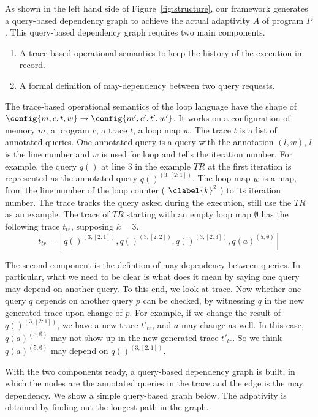As shown in the left hand side of Figure~\ref{fig:structure}, our framework generates a query-based dependency graph to achieve the actual adaptivity $A$ of program $P$. This query-based dependency graph requires two main components. 
\begin{enumerate}
    \item A trace-based operational semantics to keep the history of the execution in record.
    \item A formal definition of may-dependency between two query requests.
\end{enumerate}
  The trace-based operational semantics of the loop language have the shape of $\config{m, c, t,w} \xrightarrow{} \config{m', c',  t', w'}  $. It works on a configuration of memory $m$, a program $c$, a trace $t$, a loop map $w$. The trace $t$ is a list of annotated queries. One annotated query is a  
  query with the annotation $(l,w)$, $l$ is the line number and $w$ is used for loop and tells the iteration number. For example, the 
  query $q()$ at line $3$ in the example $TR$ at the first iteration is represented as the annotated query $q()^{(3, [2:1])}$. The loop map $w$ is a map, from the line number of the loop counter ( $\clabel{k}^{2}$ ) to its iteration number. The trace tracks the query asked during the execution, still use the $TR$ as an example. The trace of $TR$ starting with an empty loop map $\emptyset$ has the following trace $t_{tr}$, supposing $k=3$. 
  \[t_{tr} = [q()^{(3,[2:1])},q()^{(3,[2:2])},q()^{(3,[2:3])}, q(a)^{(5,\emptyset)}  ] \]
  
The second component is the defintion of may-dependency between queries. In particular, what we need to be clear is what does it mean by saying one query may depend on another query. To this end, we look at trace.  Now whether one query $q$ depends on another query $p$ can be checked, by witnessing $q$ in the new generated trace upon change of $p$. For example, if we change the result of $q()^{(3,[2:1])}$, we have a new trace $t'_{tr}$, and $a$ may change as well. In this case, $q(a)^{(5, \emptyset)}$ may not show up in the new generated trace $t'_{tr}$. So we think $q(a)^{(5, \emptyset)}$ may depend on $q()^{(3,[2:1])}$. 

With the two components ready, a query-based dependency graph is built, in which the nodes are the annotated queries in the trace and the edge is the may dependency. We show a simple query-based graph below. The adpativity is obtained by finding out the longest path in the graph.
    
